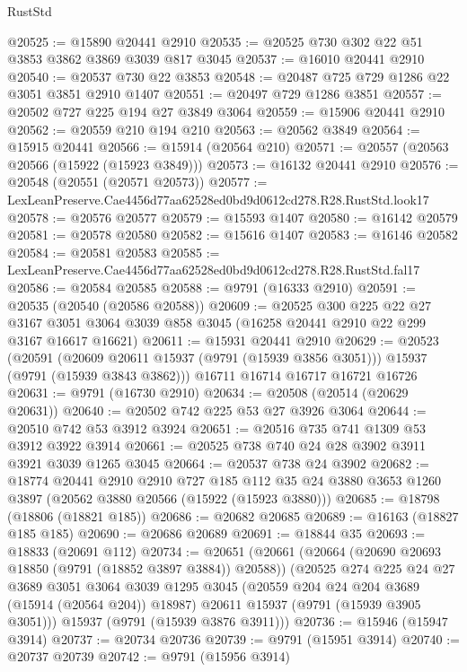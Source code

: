 \begin{lexlean}{RustStd}
\begin{coremodule}
@20525 := @15890 @20441 @2910
@20535 := @20525 @730 @302 @22 @51 @3853 @3862 @3869 @3039 @817 @3045
@20537 := @16010 @20441 @2910
@20540 := @20537 @730 @22 @3853
@20548 := @20487 @725 @729 @1286 @22 @3051 @3851 @2910 @1407
@20551 := @20497 @729 @1286 @3851
@20557 := @20502 @727 @225 @194 @27 @3849 @3064
@20559 := @15906 @20441 @2910
@20562 := @20559 @210 @194 @210
@20563 := @20562 @3849
@20564 := @15915 @20441
@20566 := @15914 (@20564 @210)
@20571 := @20557 (@20563 @20566 (@15922 (@15923 @3849)))
@20573 := @16132 @20441 @2910
@20576 := @20548 (@20551 (@20571 @20573))
@20577 := LexLeanPreserve.Cae4456d77aa62528ed0bd9d0612cd278.R28.RustStd.look17
@20578 := @20576 @20577
@20579 := @15593 @1407
@20580 := @16142 @20579
@20581 := @20578 @20580
@20582 := @15616 @1407
@20583 := @16146 @20582
@20584 := @20581 @20583
@20585 := LexLeanPreserve.Cae4456d77aa62528ed0bd9d0612cd278.R28.RustStd.fal17
@20586 := @20584 @20585
@20588 := @9791 (@16333 @2910)
@20591 := @20535 (@20540 (@20586 @20588))
@20609 := @20525
    @300
    @225
    @22
    @27
    @3167
    @3051
    @3064
    @3039
    @858
    @3045
    (@16258 @20441 @2910 @22 @299 @3167 @16617 @16621)
@20611 := @15931 @20441 @2910
@20629 := @20523
    (@20591 (@20609 @20611 @15937 (@9791 (@15939 @3856 @3051))) @15937 (@9791 (@15939 @3843 @3862)))
    @16711
    @16714
    @16717
    @16721
    @16726
@20631 := @9791 (@16730 @2910)
@20634 := @20508 (@20514 (@20629 @20631))
@20640 := @20502 @742 @225 @53 @27 @3926 @3064
@20644 := @20510 @742 @53 @3912 @3924
@20651 := @20516 @735 @741 @1309 @53 @3912 @3922 @3914
@20661 := @20525 @738 @740 @24 @28 @3902 @3911 @3921 @3039 @1265 @3045
@20664 := @20537 @738 @24 @3902
@20682 := @18774
    @20441
    @2910
    @2910
    @727
    @185
    @112
    @35
    @24
    @3880
    @3653
    @1260
    @3897
    (@20562 @3880 @20566 (@15922 (@15923 @3880)))
@20685 := @18798 (@18806 (@18821 @185))
@20686 := @20682 @20685
@20689 := @16163 (@18827 @185 @185)
@20690 := @20686 @20689
@20691 := @18844 @35
@20693 := @18833 (@20691 @112)
@20734 := @20651
    (@20661
      (@20664 (@20690 @20693 @18850 (@9791 (@18852 @3897 @3884)) @20588))
      (@20525
        @274
        @225
        @24
        @27
        @3689
        @3051
        @3064
        @3039
        @1295
        @3045
        (@20559 @204 @24 @204 @3689 (@15914 (@20564 @204)) @18987)
        @20611
        @15937
        (@9791 (@15939 @3905 @3051)))
      @15937
      (@9791 (@15939 @3876 @3911)))
@20736 := @15946 (@15947 @3914)
@20737 := @20734 @20736
@20739 := @9791 (@15951 @3914)
@20740 := @20737 @20739
@20742 := @9791 (@15956 @3914)

\end{coremodule}
\end{lexlean}
